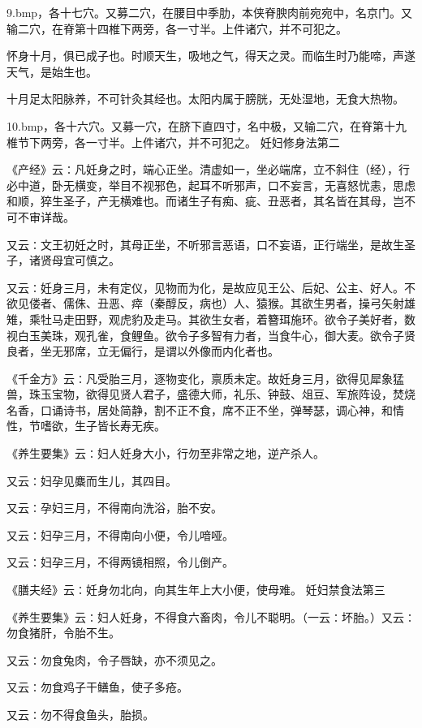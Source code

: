 \documentclass[a4paper,12pt,UTF8,twoside]{ctexbook}
\begin{document}
\pyxfc9.bmp，各十七穴。又募二穴，在腰目中季肋，本侠脊腴肉前宛宛中，名京门。又输二穴，在脊第十四椎下两旁，各一寸半。上件诸穴，并不可犯之。

怀身十月，俱已成子也。时顺天生，吸地之气，得天之灵。而临生时乃能啼，声遂天气，是始生也。

十月足太阳脉养，不可针灸其经也。太阳内属于膀胱，无处湿地，无食大热物。

\pyxfc10.bmp，各十六穴。又募一穴，在脐下直四寸，名中极，又输二穴，在脊第十九椎节下两旁，各一寸半。上件诸穴，并不可犯之。
妊妇修身法第二

《产经》云∶凡妊身之时，端心正坐。清虚如一，坐必端席，立不斜住（经），行必中道，卧无横变，举目不视邪色，起耳不听邪声，口不妄言，无喜怒忧恚，思虑和顺，猝生圣子，产无横难也。而诸生子有痴、疵、丑恶者，其名皆在其母，岂不可不审详哉。

又云∶文王初妊之时，其母正坐，不听邪言恶语，口不妄语，正行端坐，是故生圣子，诸贤母宜可慎之。

又云∶妊身三月，未有定仪，见物而为化，是故应见王公、后妃、公主、好人。不欲见偻者、儒侏、丑恶、瘁（秦醇反，病也）人、猿猴。其欲生男者，操弓矢射雄雉，乘牡马走田野，观虎豹及走马。其欲生女者，着簪珥施环。欲令子美好者，数视白玉美珠，观孔雀，食鲤鱼。欲令子多智有力者，当食牛心，御大麦。欲令子贤良者，坐无邪席，立无偏行，是谓以外像而内化者也。

《千金方》云∶凡受胎三月，逐物变化，禀质未定。故妊身三月，欲得见犀象猛兽，珠玉宝物，欲得见贤人君子，盛德大师，礼乐、钟鼓、俎豆、军旅阵设，焚烧名香，口诵诗书，居处简静，割不正不食，席不正不坐，弹琴瑟，调心神，和情性，节嗜欲，生子皆长寿无疾。

《养生要集》云∶妇人妊身大小，行勿至非常之地，逆产杀人。

又云∶妇孕见麋而生儿，其四目。

又云∶孕妇三月，不得南向洗浴，胎不安。

又云∶妇孕三月，不得南向小便，令儿喑哑。

又云∶妇孕三月，不得两镜相照，令儿倒产。

《膳夫经》云∶妊身勿北向，向其生年上大小便，使母难。
妊妇禁食法第三

《养生要集》云∶妇人妊身，不得食六畜肉，令儿不聪明。（一云∶坏胎。）又云∶勿食猪肝，令胎不生。

又云∶勿食兔肉，令子唇缺，亦不须见之。

又云∶勿食鸡子干鳝鱼，使子多疮。

又云∶勿不得食鱼头，胎损。
\end{document}

